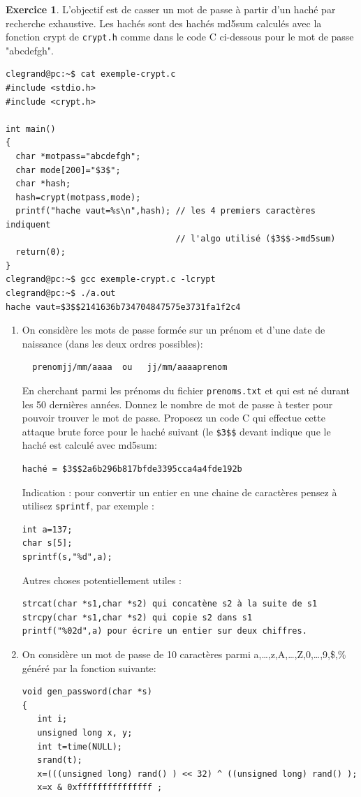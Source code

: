 \documentclass[a4paper,9pt]{article}
\theoremstyle{plain}
\theoremstyle{definition}
\newtheorem{exercice}{Exercice}
\newenvironment{terminal}{\color{black}\begin{snugshade*}}
{\end{snugshade*}\color{black}}
\begin{document}
\begin{exercice}
  L'objectif est de casser un mot de passe à partir d'un haché par recherche exhaustive. Les hachés sont des hachés md5sum  calculés avec la fonction crypt de \verb|crypt.h| comme dans le code C ci-dessous pour le mot de passe "abcdefgh".
  \begin{terminal}
\begin{verbatim}
clegrand@pc:~$ cat exemple-crypt.c
#include <stdio.h>
#include <crypt.h>

int main()
{
  char *motpass="abcdefgh";  
  char mode[200]="$3$";         
  char *hash;
  hash=crypt(motpass,mode);
  printf("hache vaut=%s\n",hash); // les 4 premiers caractères indiquent
                                  // l'algo utilisé ($3$$->md5sum)
  return(0);
}
clegrand@pc:~$ gcc exemple-crypt.c -lcrypt
clegrand@pc:~$ ./a.out 
hache vaut=$3$$2141636b734704847575e3731fa1f2c4
\end{verbatim}
\end{terminal}
\begin{enumerate}
\item On considère les mots de passe formée sur un prénom et d'une date de naissance (dans les deux ordres possibles):
\begin{verbatim}
  prenomjj/mm/aaaa  ou   jj/mm/aaaaprenom
\end{verbatim}
En cherchant parmi les prénoms du fichier \verb|prenoms.txt| et qui est né durant les 50 dernières années. Donnez le nombre de mot de passe à tester pour pouvoir trouver le mot de passe. Proposez un code C qui effectue cette attaque brute force pour le haché suivant (le \verb|$3$$| devant indique que le haché est calculé avec md5sum:
\begin{verbatim}
haché = $3$$2a6b296b817bfde3395cca4a4fde192b
\end{verbatim}
Indication : pour convertir un entier en une chaine de caractères pensez à utilisez \verb|sprintf|, par exemple  :
\begin{verbatim}
int a=137;
char s[5];
sprintf(s,"%d",a);
\end{verbatim}
Autres choses potentiellement utiles :
\begin{verbatim}
strcat(char *s1,char *s2) qui concatène s2 à la suite de s1
strcpy(char *s1,char *s2) qui copie s2 dans s1
printf("%02d",a) pour écrire un entier sur deux chiffres.
\end{verbatim}
\item On considère un mot de passe de 10 caractères parmi a,\ldots,z,A,\ldots,Z,0,\ldots,9,\$,\% généré par la fonction suivante:
\begin{terminal}
\begin{verbatim}
void gen_password(char *s)
{
   int i;
   unsigned long x, y;
   int t=time(NULL);      
   srand(t);
   x=(((unsigned long) rand() ) << 32) ^ ((unsigned long) rand() );
   x=x & 0xfffffffffffffff ;
  

\end{verbatim}
\end{terminal}
\end{enumerate}
\end{exercice}
\end{document}

